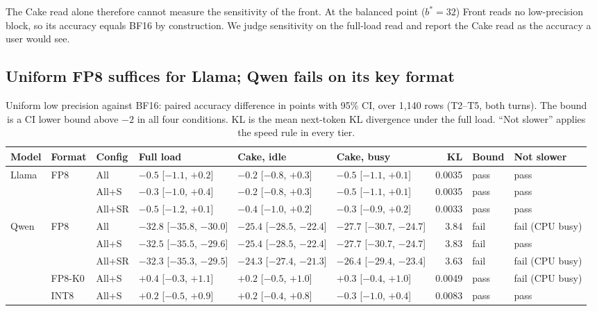 \documentclass[conference]{IEEEtran}
\newcommand{\cfg}[1]{\textsf{#1}}
\begin{document}
The Cake read alone therefore cannot measure the sensitivity of the front.
At the balanced point ($b^\ast{=}32$) \cfg{Front} reads no low-precision block, so its accuracy equals \cfg{BF16} by construction.
We judge sensitivity on the full-load read and report the Cake read as the accuracy a user would see.

\subsection{Uniform FP8 suffices for Llama; Qwen fails on its key format}\label{sec:fp8}

\begin{table}[t]
\centering
\caption{Uniform low precision against \cfg{BF16}: paired accuracy difference in points with 95\% CI, over 1,140 rows (T2--T5, both turns). The bound is a CI lower bound above $-2$ in all four conditions. KL is the mean next-token KL divergence under the full load. ``Not slower'' applies the speed rule in every tier.}
\label{tab:quality}
\footnotesize
\begin{tabular}{@{}l l l l l l r l l@{}}
\toprule
Model & Format & Config & Full load & Cake, idle & Cake, busy & KL & Bound & Not slower \\
\midrule
\multirow{3}{*}{Llama} & \multirow{3}{*}{FP8} & \cfg{All} & $-0.5$ [$-1.1$, $+0.2$] & $-0.2$ [$-0.8$, $+0.3$] & $-0.5$ [$-1.1$, $+0.1$] & 0.0035 & pass & pass \\
 & & \cfg{All+S} & $-0.3$ [$-1.0$, $+0.4$] & $-0.2$ [$-0.8$, $+0.3$] & $-0.5$ [$-1.1$, $+0.1$] & 0.0035 & pass & pass \\
 & & \cfg{All+SR} & $-0.5$ [$-1.2$, $+0.1$] & $-0.4$ [$-1.0$, $+0.2$] & $-0.3$ [$-0.9$, $+0.2$] & 0.0033 & pass & pass \\
\midrule
\multirow{5}{*}{Qwen} & \multirow{3}{*}{FP8} & \cfg{All} & $-32.8$ [$-35.8$, $-30.0$] & $-25.4$ [$-28.5$, $-22.4$] & $-27.7$ [$-30.7$, $-24.7$] & 3.84 & fail & fail (CPU busy) \\
 & & \cfg{All+S} & $-32.5$ [$-35.5$, $-29.6$] & $-25.4$ [$-28.5$, $-22.4$] & $-27.7$ [$-30.7$, $-24.7$] & 3.83 & fail & pass \\
 & & \cfg{All+SR} & $-32.3$ [$-35.3$, $-29.5$] & $-24.3$ [$-27.4$, $-21.3$] & $-26.4$ [$-29.4$, $-23.4$] & 3.63 & fail & fail (CPU busy) \\
\cmidrule(l){2-9}
 & \cfg{FP8-K0} & \cfg{All+S} & $+0.4$ [$-0.3$, $+1.1$] & $+0.2$ [$-0.5$, $+1.0$] & $+0.3$ [$-0.4$, $+1.0$] & 0.0049 & pass & fail (CPU busy) \\
 & \cfg{INT8} & \cfg{All+S} & $+0.2$ [$-0.5$, $+0.9$] & $+0.2$ [$-0.4$, $+0.8$] & $-0.3$ [$-1.0$, $+0.4$] & 0.0083 & pass & pass \\

\end{tabular}
\end{table}
\end{document}

